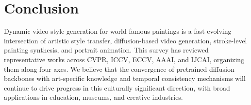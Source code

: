 \documentclass[letterpaper,twocolumn,10pt]{article}
\begin{document}
\section{Conclusion}
\label{sec:conclusion}

Dynamic video-style generation for world-famous paintings is a fast-evolving intersection
of artistic style transfer, diffusion-based video generation, stroke-level painting
synthesis, and portrait animation. This survey has reviewed representative works across
CVPR, ICCV, ECCV, AAAI, and IJCAI, organizing them along four axes. We believe that the
convergence of pretrained diffusion backbones with art-specific knowledge and temporal
consistency mechanisms will continue to drive progress in this culturally significant
direction, with broad applications in education, museums, and creative industries.



\end{document}
